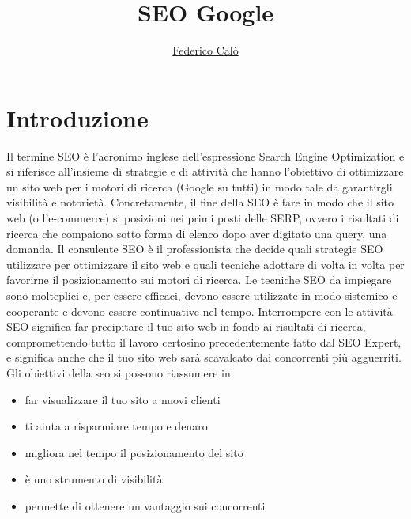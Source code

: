 \documentclass[a4paper]{extarticle}
\title{SEO Google}
\author{\href{http://www.federicocalo.it}{Federico Calò} }
\date{}
\begin{document}
\maketitle
\newpage
\tableofcontents
\voffset -30pt

\newpage
\section{Introduzione}
Il termine SEO è l’acronimo inglese dell’espressione Search Engine Optimization e si riferisce all’insieme di strategie e di attività che hanno l’obiettivo di ottimizzare un sito web per i motori di ricerca (Google su tutti) in modo tale da garantirgli visibilità e notorietà. Concretamente, il fine della SEO è fare in modo che il sito web (o l’e-commerce) si posizioni nei primi posti delle SERP, ovvero i risultati di ricerca che compaiono sotto forma di elenco dopo aver digitato una query, una domanda. Il consulente SEO è il professionista che decide quali strategie SEO utilizzare per ottimizzare il sito web e quali tecniche adottare di volta in volta per favorirne il posizionamento sui motori di ricerca. Le tecniche SEO da impiegare sono molteplici e, per essere efficaci, devono essere utilizzate in modo sistemico e cooperante e devono essere continuative nel tempo. Interrompere con le attività SEO significa far precipitare il tuo sito web in fondo ai risultati di ricerca, compromettendo tutto il lavoro certosino precedentemente fatto dal SEO Expert, e significa anche che il tuo sito web sarà scavalcato dai concorrenti più agguerriti. Gli obiettivi della seo si possono riassumere in:

\begin{itemize}
\item far visualizzare il tuo sito a nuovi clienti 
\item ti aiuta a risparmiare tempo e denaro
\item migliora nel tempo il posizionamento del sito
\item è uno strumento di visibilità
\item  permette di ottenere un vantaggio sui concorrenti
\end{itemize}
\end{document}
